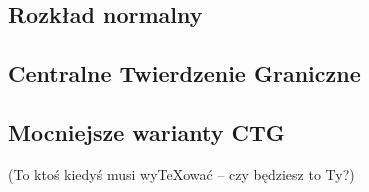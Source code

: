 {    

\makeatletter
{}
\makeatother
\graphicspath{{../probabil}}

\let\realsection\section
\let\realsubsection\subsection
\let\section\subsection
\let\subsection\subsubsection
\let\subsubsection\paragraph

\realsubsection{Rozkład normalny} 


\realsubsection{Centralne Twierdzenie Graniczne}


\realsubsection{Mocniejsze warianty CTG}
(To ktoś kiedyś musi wyTeXować -- czy będziesz to Ty?)
}



